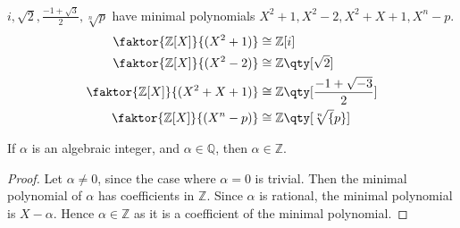 \begin{example}
	$i, \sqrt{2}, \frac{-1 + \sqrt{3}}{2}, \sqrt[n]{p}$ have minimal polynomials $X^2 + 1, X^2 - 2, X^2 + X + 1, X^n - p$.
	\begin{align*}
		\faktor{\mathbb Z[X]}{(X^2 + 1)}     & \cong \mathbb Z[i]                          \\
		\faktor{\mathbb Z[X]}{(X^2 - 2)}     & \cong \mathbb Z\qty[\sqrt{2}]               \\
		\faktor{\mathbb Z[X]}{(X^2 + X + 1)} & \cong \mathbb Z\qty[\frac{-1+\sqrt{-3}}{2}] \\
		\faktor{\mathbb Z[X]}{(X^n - p)}     & \cong \mathbb Z\qty[\sqrt[n]{p}]
	\end{align*}
\end{example} 

\begin{corollary} \label{cor:12.5}
	If $\alpha$ is an algebraic integer, and $\alpha \in \mathbb Q$, then $\alpha \in \mathbb Z$.
\end{corollary}

\begin{proof}
	Let $\alpha \neq 0$, since the case where $\alpha = 0$ is trivial.
	Then the minimal polynomial of $\alpha$ has coefficients in $\mathbb Z$.
	Since $\alpha$ is rational, the minimal polynomial is $X - \alpha$.
	Hence $\alpha \in \mathbb Z$ as it is a coefficient of the minimal polynomial.
\end{proof}
